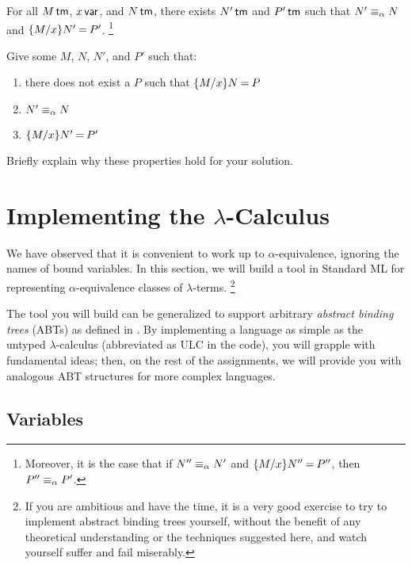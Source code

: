 \documentclass[11pt]{article}
\begin{document}
\begin{theorem}\label{thm:subst-aequiv}
  For all ${M}\,\textsf{tm}$, ${x}\,\textsf{var}$, and ${N}\,\textsf{tm}$,
  there exists ${N'}\,\textsf{tm}$ and ${P'}\,\textsf{tm}$ such that
  ${N'}\mathrel{\equiv_\alpha}{N}$ and
  $\{{M}\mathord{/}{x}\}{N'}\mathbin{=}{P'}$.%
  \footnote{Moreover, it is the case that if ${N''}\mathrel{\equiv_\alpha}{N'}$ and $\{{M}\mathord{/}{x}\}{N''}\mathbin{=}{P''}$, then ${P''}\mathrel{\equiv_\alpha}{P'}$.}
\end{theorem}

\begin{task}{10}
  Give some $M$, $N$, $N'$, and $P'$ such that:
  \begin{enumerate}
    \item there does not exist a $P$ such that $\{{M}\mathord{/}{x}\}{N}\mathbin{=}{P}$
    \item ${N'}\mathrel{\equiv_\alpha}{N}$
    \item $\{{M}\mathord{/}{x}\}{N'}\mathbin{=}{P'}$
  \end{enumerate}
  Briefly explain why these properties hold for your solution.
\end{task}


\section[Implementing the Lambda Calculus]{Implementing the $\lambda$-Calculus}\label{sec:abt}

We have observed that it is convenient to work up to $\alpha$-equivalence, ignoring the names of bound variables.
In this section, we will build a tool in Standard ML for representing $\alpha$-equivalence classes of $\lambda$-terms.%
\footnote{If you are ambitious and have the time, it is a very good exercise to try to implement abstract binding trees yourself, without the benefit of any theoretical understanding or the techniques suggested here, and watch yourself suffer and fail miserably.}

The tool you will build can be generalized to support arbitrary \emph{abstract binding trees} (ABTs) as defined in \PFPL[1].
By implementing a language as simple as the untyped $\lambda$-calculus (abbreviated as ULC in the code), you will grapple with fundamental ideas; then, on the rest of the assignments, we will provide you with analogous ABT structures for more complex languages.

\subsection{Variables}\label{sec:abt-var}
\end{document}
